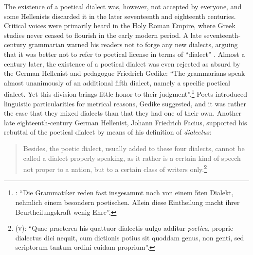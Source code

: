The existence of a poetical dialect was, however, not accepted by everyone, and some Hellenists discarded it in the later seventeenth and eighteenth centuries. Critical voices were primarily heard in the Holy Roman Empire, where Greek studies never ceased to flourish in the early modern period. A late seven\-teenth-century grammarian warned his readers not to forge any new dialects, arguing that it was better not to refer to poetical license in terms of “dialect” \citep[512]{Ursin1691}. Almost a century later, the existence of a poetical dialect was even rejected as absurd by the German Hellenist and pedagogue Friedrich Gedike: “The grammarians speak almost unanimously of an additional fifth dialect, namely a specific poetical dialect. Yet this division brings little honor to their judgment”.\footnote{\citet[21]{Gedike1782}: “Die Grammatiker reden fast insgesammt noch von einem 5ten Dialekt, nehmlich einem besondern poetischen. Allein diese Eintheilung macht ihrer Beurtheilungskraft wenig Ehre”.} Poets introduced linguistic particularities for metrical reasons, Gedike suggested, and it was rather the case that they mixed dialects than that they had one of their own. Another late eighteenth-century German Hellenist, Johann Friedrich Facius, supported his rebuttal of the poetical dialect by means of his definition of \textit{dialectus}:

\begin{quote}
Besides, the poetic dialect, usually added to these four dialects, cannot be called a dialect properly speaking, as it rather is a certain kind of speech not proper to a nation, but to a certain class of writers only.\footnote{\citet[]{Facius1782} (\textsc{v}): “Quae praeterea his quattuor dialectis uulgo additur \textit{poetica}, proprie dialectus dici nequit, cum dictionis potius sit quoddam genus, non genti, sed scriptorum tantum ordini cuidam proprium”.}
\end{quote}

